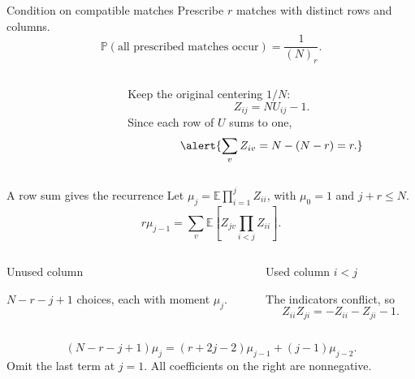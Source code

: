 \documentclass[aspectratio=169,11pt]{beamer}
\newcommand{\slidesource}{}
\newcommand{\source}[1]{\gdef\slidesource{#1}}
\newcommand{\E}{\mathbb E}
\newcommand{\PP}{\mathbb P}
\newcommand{\1}{\mathbf 1}
\newcommand{\takeaway}[1]{\par\vspace{2mm}{\color{teal}\bfseries #1}\par}
\newcommand{\smallgap}{\vspace{2mm}}
\begin{document}
\source{Report: ``Exact depleted moments''. Only a compatible prescribed set is exposed.}
\begin{frame}{Condition on compatible matches}
Prescribe $r$ matches with distinct rows and columns.
\[
\PP(\text{all prescribed matches occur})=\frac1{(N)_r}.
\]
\vspace{-1mm}
\begin{columns}[c,onlytextwidth]
\begin{column}{0.46\textwidth}
\centering
{}
\end{column}
\begin{column}{0.49\textwidth}
Keep the original centering $1/N$:
\[
Z_{ij}=NU_{ij}-1.
\]
Since each row of $U$ sums to one,
\[
\alert{\sum_v Z_{iv}=N-(N-r)=r.}
\]
\end{column}
\end{columns}
\takeaway{The remaining row sum is $r$, not zero.}
\end{frame}

\source{Report: Lemma ``Depleted row-sum recurrence''. At r = 0, the rescaled recurrence is Collins and Nagatsu, Proposition 3.3.}
\begin{frame}{A row sum gives the recurrence}
Let $\mu_j=\E\prod_{i=1}^j Z_{ii}$, with $\mu_0=1$ and $j+r\le N$.
\[
r\mu_{j-1}=\sum_v\E\!\left[Z_{jv}\prod_{i<j}Z_{ii}\right].
\]
\vspace{-2mm}
\begin{columns}[T,onlytextwidth]
\begin{column}{0.45\textwidth}
\alert{Unused column}\par\smallgap
$N-r-j+1$ choices, each with moment $\mu_j$.
\end{column}
\begin{column}{0.51\textwidth}
\alert{Used column $i<j$}\par\smallgap
The indicators conflict, so
\[
Z_{ii}Z_{ji}=-Z_{ii}-Z_{ji}-1.
\]
\end{column}
\end{columns}
\vspace{1mm}
\[
\boxed{(N-r-j+1)\mu_j
=(r+2j-2)\mu_{j-1}+(j-1)\mu_{j-2}.}
\]
\centering\small Omit the last term at $j=1$. All coefficients on the right are nonnegative.
\end{frame}
\end{document}
